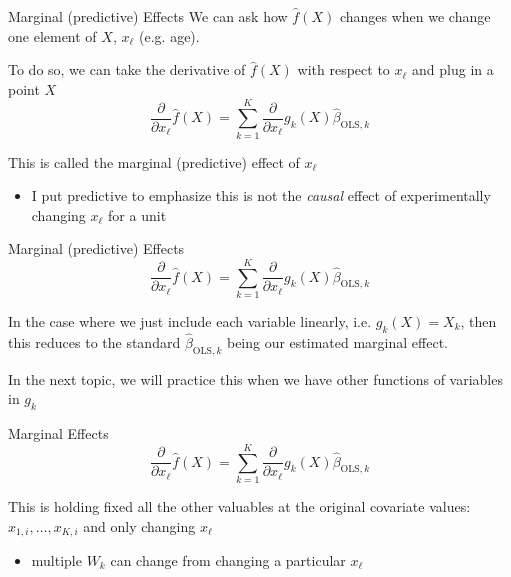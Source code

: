 \documentclass[aspectratio=169,t,11pt,table]{beamer}
\begin{document}
\begin{frame}{Marginal (predictive) Effects}
  We can ask how $\hat{f}(X)$ changes when we change one element of $X$, $x_\ell$ (e.g. age).

  \bigskip
  To do so, we can take the derivative of $\hat{f}(X)$ with respect to $x_\ell$ and plug in a point $X$
  $$
    \frac{\partial}{\partial x_\ell} \hat{f}(X) = 
    \sum_{k=1}^K \frac{\partial}{\partial x_\ell} g_{k}(X) \hat{\beta}_{\text{OLS}, k}
  $$
  
  \bigskip
  This is called the \alert{marginal (predictive) effect} of $x_\ell$
  \begin{itemize}
    \item I put predictive to emphasize this is not the \emph{causal} effect of experimentally changing $x_\ell$ for a unit 
  \end{itemize}
\end{frame}

\begin{frame}{Marginal (predictive) Effects}
  \vspace*{-\bigskipamount}
  $$
    \frac{\partial}{\partial x_\ell} \hat{f}(X) = 
    \sum_{k=1}^K \frac{\partial}{\partial x_\ell} g_{k}(X) \hat{\beta}_{\text{OLS}, k}
  $$
  
  \bigskip
  In the case where we just include each variable linearly, i.e. $g_k(X) = X_k$, then this reduces to the standard $\hat{\beta}_{\text{OLS}, k}$ being our estimated marginal effect.

  \pause
  \bigskip
  In the next topic, we will practice this when we have other functions of variables in $g_k$
\end{frame}

\begin{frame}{Marginal Effects}
  $$
    \frac{\partial}{\partial x_\ell} \hat{f}(X) = \sum_{k=1}^K \frac{\partial}{\partial x_\ell} g_{k}(X) \hat{\beta}_{\text{OLS}, k}
  $$
  
  \bigskip
  This is holding fixed all the other valuables at the original covariate values: $x_{1,i}, \dots, x_{K,i}$ and only changing $x_{\ell}$
  \begin{itemize}
    \item multiple $W_k$ can change from changing a particular $x_{\ell}$ 
  \end{itemize}
\end{frame}

\end{document}

